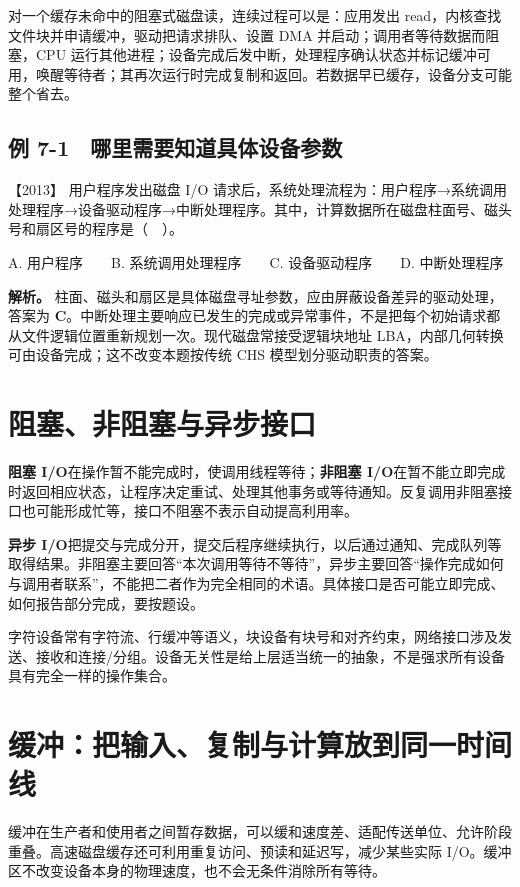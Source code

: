 对一个缓存未命中的阻塞式磁盘读，连续过程可以是：应用发出 read，内核查找文件块并申请缓冲，驱动把请求排队、设置 DMA 并启动；调用者等待数据而阻塞，CPU 运行其他进程；设备完成后发中断，处理程序确认状态并标记缓冲可用，唤醒等待者；其再次运行时完成复制和返回。若数据早已缓存，设备分支可能整个省去。

\subsection{例 7-1　哪里需要知道具体设备参数}\label{os-ex7-1}

\noindent{}【2013】 用户程序发出磁盘 I/O 请求后，系统处理流程为：用户程序→系统调用处理程序→设备驱动程序→中断处理程序。其中，计算数据所在磁盘柱面号、磁头号和扇区号的程序是（　）。

A. 用户程序　　B. 系统调用处理程序　　C. 设备驱动程序　　D. 中断处理程序


\textbf{解析。} 柱面、磁头和扇区是具体磁盘寻址参数，应由屏蔽设备差异的驱动处理，答案为 \textbf{C}。中断处理主要响应已发生的完成或异常事件，不是把每个初始请求都从文件逻辑位置重新规划一次。现代磁盘常接受逻辑块地址 LBA，内部几何转换可由设备完成；这不改变本题按传统 CHS 模型划分驱动职责的答案。

\section{阻塞、非阻塞与异步接口}\label{os-7-4}

\textbf{阻塞 I/O}在操作暂不能完成时，使调用线程等待；\textbf{非阻塞 I/O}在暂不能立即完成时返回相应状态，让程序决定重试、处理其他事务或等待通知。反复调用非阻塞接口也可能形成忙等，接口不阻塞不表示自动提高利用率。

\textbf{异步 I/O}把提交与完成分开，提交后程序继续执行，以后通过通知、完成队列等取得结果。非阻塞主要回答``本次调用等待不等待''，异步主要回答``操作完成如何与调用者联系''，不能把二者作为完全相同的术语。具体接口是否可能立即完成、如何报告部分完成，要按题设。

字符设备常有字符流、行缓冲等语义，块设备有块号和对齐约束，网络接口涉及发送、接收和连接/分组。设备无关性是给上层适当统一的抽象，不是强求所有设备具有完全一样的操作集合。

\section{缓冲：把输入、复制与计算放到同一时间线}\label{os-7-5}

缓冲在生产者和使用者之间暂存数据，可以缓和速度差、适配传送单位、允许阶段重叠。高速磁盘缓存还可利用重复访问、预读和延迟写，减少某些实际 I/O。缓冲区不改变设备本身的物理速度，也不会无条件消除所有等待。

